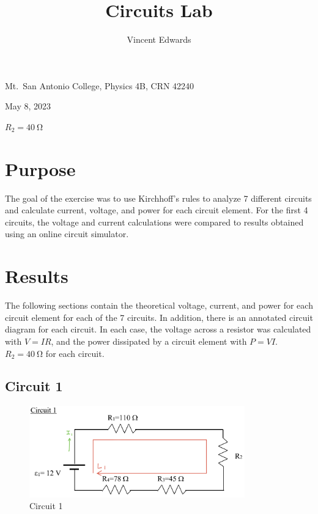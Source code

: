 \documentclass[12pt]{iopart} %
\gdef\units#1{~\mathrm{#1}}
\begin{document}
\title{Circuits Lab}
\author{Vincent Edwards}
\vspace{10pt}
\begin{indented}
  \item[]Mt.~San Antonio College, Physics 4B, CRN 42240
  \item[]May 8, 2023
  \item[]
  \item[]$R_2 = 40 \units{\Omega}$
\end{indented}
\newpage

\section{Purpose}

The goal of the exercise was to use Kirchhoff's rules to analyze 7 different circuits and calculate current, voltage, and power for each circuit element.
For the first 4 circuits, the voltage and current calculations were compared to results obtained using an online circuit simulator.

\section{Results}

The following sections contain the theoretical voltage, current, and power for each circuit element for each of the 7 circuits.
In addition, there is an annotated circuit diagram for each circuit.
In each case, the voltage across a resistor was calculated with $V = IR$, and the power dissipated by a circuit element with $P = VI$.
$R_2 = 40 \units{\Omega}$ for each circuit.

\subsection{Circuit 1}

\begin{figure}[htbp]
  \begin{indented}
  \item[]\includegraphics[width=0.83\textwidth]{media/circuit-1.png}
  \end{indented}
  \caption{\label{fig:circuit_1}
  Circuit 1
  }
\end{figure}
\end{document}
